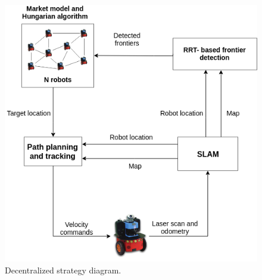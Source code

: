 \documentclass[letterpaper, 10 pt, conference]{ieeeconf}  %
\begin{document}
\begin{figure}[H]
	\centering\includegraphics[width=1.0\columnwidth]{Impementationdiagram.png}
	\caption{Decentralized strategy diagram.}
	\label{fig:implementation-diagram}
\end{figure}
\end{document}

